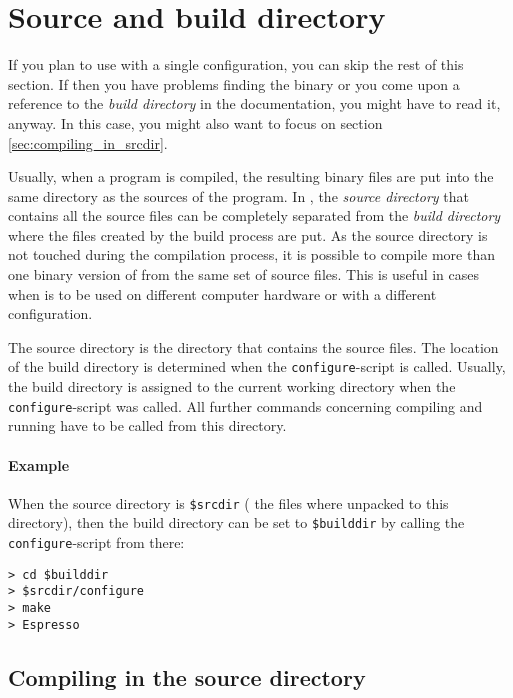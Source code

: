 \section{Source and build directory}
\label{sec:builddir}
 

If you plan to use \es{} with a single configuration, you can skip the
rest of this section. If then you have problems finding the \es{}
binary or you come upon a reference to the \emph{build directory} in
the documentation, you might have to read it, anyway. In this case,
you might also want to focus on section
\vref{sec:compiling_in_srcdir}.

Usually, when a program is compiled, the resulting binary files are
put into the same directory as the sources of the program. In \es{},
the \emph{source directory} that contains all the source files can be
completely separated from the \emph{build directory} where the files
created by the build process are put. As the source directory is not
touched during the compilation process, it is possible to compile more
than one binary version of \es{} from the same set of source files.
This is useful in cases when \es{} is to be used on different computer
hardware or with a different configuration.

The source directory is the directory that contains the source files.
The location of the build directory is determined when the
\texttt{configure}-script is called.  Usually, the build directory is
assigned to the current working directory when the
\texttt{configure}-script was called. All further commands concerning
compiling and running \es{} have to be called from this directory.

\paragraph{Example}
When the source directory is \texttt{\$srcdir} (\ie{} the files where
unpacked to this directory), then the build directory can be set to
\texttt{\$builddir} by calling the \texttt{configure}-script from
there:
\begin{verbatim}
> cd $builddir
> $srcdir/configure
> make
> Espresso
\end{verbatim}

\subsection{Compiling in the source directory}
\label{sec:compiling_in_srcdir}

